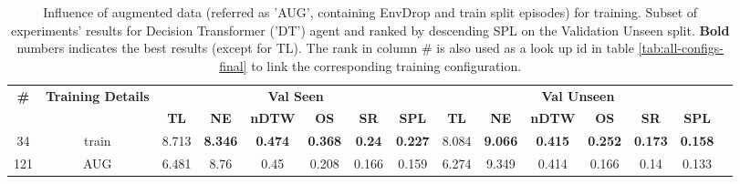 \begin{table}
\centering
\caption{\label{tab:dt_env_drop}Influence of augmented data (referred as 'AUG', containing EnvDrop and train split episodes) for training. Subset of experiments' results for Decision Transformer ('DT') agent and ranked by descending SPL on the Validation Unseen split. \textbf{Bold} numbers indicates the best results (except for TL). The rank in column \# is also used as a look up id in table \ref{tab:all-configs-final} to link the corresponding training configuration.}
\begin{tabular}{@{\hskip3pt}c@{\hskip3pt}c@{\hskip3pt}c@{\hskip3pt}c@{\hskip3pt}c@{\hskip3pt}c@{\hskip3pt}c@{\hskip3pt}c@{\hskip3pt}c@{\hskip3pt}c@{\hskip3pt}c@{\hskip3pt}c@{\hskip3pt}c@{\hskip3pt}c@{\hskip3pt}c}
\toprule
                                  \textbf{\#} & \textbf{Training Details} & \multicolumn{6}{c}{\textbf{Val Seen}} & \multicolumn{6}{c}{\textbf{Val Unseen}} \\
\cmidrule(l){3-8}\cmidrule(l){9-14}\textbf{~} &                \textbf{~} &       \textbf{TL} &     \textbf{NE} &   \textbf{nDTW} &     \textbf{OS} &    \textbf{SR} &    \textbf{SPL} &         \textbf{TL} &     \textbf{NE} &   \textbf{nDTW} &     \textbf{OS} &     \textbf{SR} &    \textbf{SPL} \\
\midrule
                                           34 &                     train &             8.713 &  \textbf{8.346} &  \textbf{0.474} &  \textbf{0.368} &  \textbf{0.24} &  \textbf{0.227} &               8.084 &  \textbf{9.066} &  \textbf{0.415} &  \textbf{0.252} &  \textbf{0.173} &  \textbf{0.158} \\
                                          121 &                       AUG &             6.481 &            8.76 &            0.45 &           0.208 &          0.166 &           0.159 &               6.274 &           9.349 &           0.414 &           0.166 &            0.14 &           0.133 \\
\bottomrule
\end{tabular}
\end{table}
